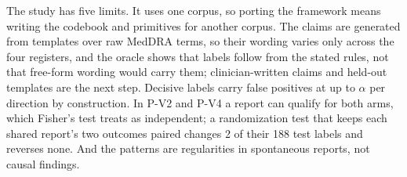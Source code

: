 The study has five limits. It uses one corpus, so porting the framework
means writing the codebook and primitives for another corpus. The claims are generated from
templates over raw MedDRA terms, so their wording varies only across the four
registers, and the oracle shows that labels follow from the stated rules, not
that free-form wording would carry them; clinician-written claims and
held-out templates are the next step. Decisive labels carry false positives
at up to $\alpha$ per direction by construction. In P-V2 and P-V4 a report can
qualify for both arms, which Fisher's test treats as independent; a
randomization test that keeps each shared report's two outcomes paired changes
2 of their 188 test labels and reverses none. And the patterns are regularities in
spontaneous reports, not causal findings.
